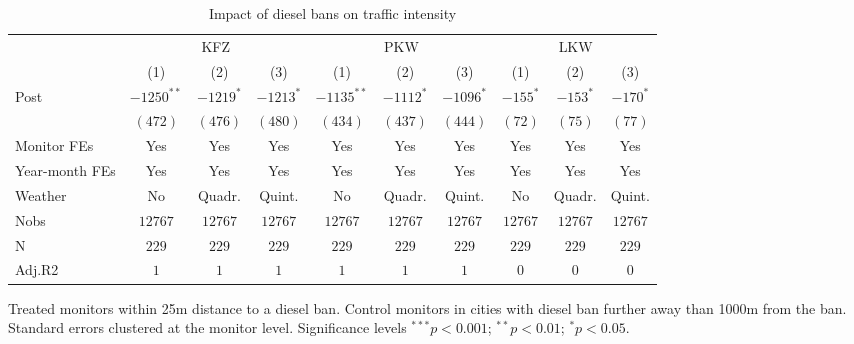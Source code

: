 
\begin{table}[h]
\caption{Impact of diesel bans on traffic intensity}
\begin{center}
\begin{footnotesize}
\begin{threeparttable}
\begin{tabular}{l c c c c c c c c c}
\toprule
& \multicolumn{3}{c}{KFZ} & \multicolumn{3}{c}{PKW}  & \multicolumn{3}{c}{LKW} \\ \cmidrule(r){2-4} \cmidrule(r){5-7} \cmidrule(r){8-10}
 & (1) & (2) & (3) & (1) & (2) & (3) & (1) & (2) & (3) \\
\midrule
Post   & $-1250^{**}$ & $-1219^{*}$ & $-1213^{*}$ & $-1135^{**}$ & $-1112^{*}$ & $-1096^{*}$ & $-155^{*}$ & $-153^{*}$ & $-170^{*}$ \\
       & $(472)$      & $(476)$     & $(480)$     & $(434)$      & $(437)$     & $(444)$     & $(72)$     & $(75)$     & $(77)$     \\
\midrule
Monitor FEs   & Yes & Yes & Yes  & Yes & Yes & Yes & Yes & Yes & Yes    \\
Year-month FEs     & Yes & Yes & Yes  & Yes & Yes & Yes & Yes & Yes & Yes  \\
Weather     & No & Quadr. & Quint.  & No & Quadr. & Quint. & No & Quadr. & Quint.   \\ \midrule
Nobs   & $12767$      & $12767$     & $12767$     & $12767$      & $12767$     & $12767$     & $12767$    & $12767$    & $12767$    \\
N      & $229$        & $229$       & $229$       & $229$        & $229$       & $229$       & $229$      & $229$      & $229$      \\
Adj.R2 & $1$          & $1$         & $1$         & $1$          & $1$         & $1$         & $0$        & $0$        & $0$        \\
\bottomrule
\end{tabular}
\begin{tablenotes}[flushleft]
\tiny{\item Treated monitors within 25m distance to a diesel ban. 
       Control monitors in cities with diesel ban further away than 1000m from the ban. 
       Standard errors clustered at the monitor level.
       Significance levels $^{***}p<0.001$; $^{**}p<0.01$; $^{*}p<0.05$.}
\end{tablenotes}
\end{threeparttable}
\end{footnotesize}
\label{table:coefficients}
\end{center}
\end{table}
